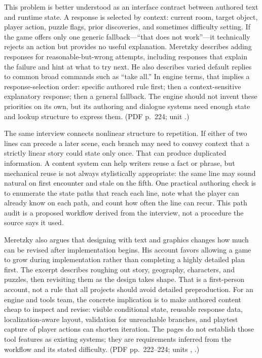 This problem is better understood as an interface contract between authored text and runtime state. A response is selected by context: current room, target object, player action, puzzle flags, prior discoveries, and sometimes difficulty setting. If the game offers only one generic fallback---``that does not work''---it technically rejects an action but provides no useful explanation. Meretzky describes adding responses for reasonable-but-wrong attempts, including responses that explain the failure and hint at what to try next. He also describes varied default replies to common broad commands such as ``take all.'' In engine terms, that implies a response-selection order: specific authored rule first; then a context-sensitive explanatory response; then a general fallback. The engine should not invent these priorities on its own, but its authoring and dialogue systems need enough state and lookup structure to express them. (PDF p.~224; unit .)

The same interview connects nonlinear structure to repetition. If either of two lines can precede a later scene, each branch may need to convey context that a strictly linear story could state only once. That can produce duplicated information. A content system can help writers reuse a fact or phrase, but mechanical reuse is not always stylistically appropriate: the same line may sound natural on first encounter and stale on the fifth. One practical authoring check is to enumerate the state paths that reach each line, note what the player can already know on each path, and count how often the line can recur. This path audit is a proposed workflow derived from the interview, not a procedure the source says it used.

Meretzky also argues that designing with text and graphics changes how much can be revised after implementation begins. His account favors allowing a game to grow during implementation rather than completing a highly detailed plan first. The excerpt describes roughing out story, geography, characters, and puzzles, then revisiting them as the design takes shape. That is a first-person account, not a rule that all projects should avoid detailed preproduction. For an engine and tools team, the concrete implication is to make authored content cheap to inspect and revise: visible conditional state, reusable response data, localization-aware layout, validation for unreachable branches, and playtest capture of player actions can shorten iteration. The pages do not establish those tool features as existing systems; they are requirements inferred from the workflow and its stated difficulty. (PDF pp.~222--224; units , .)

